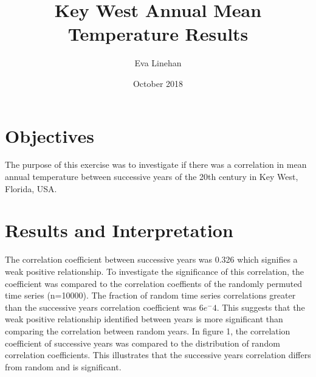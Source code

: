 \documentclass[12pt]{article}
\title{Key West Annual Mean Temperature Results}
\author{Eva Linehan}
\date{October 2018}
\begin{document}
  \maketitle
  
  \section{Objectives}
  The purpose of this exercise was to investigate if there was a correlation in mean annual temperature between successive years of the 20th century in Key West, Florida, USA.  
  
  \section{Results and Interpretation}
  The correlation coefficient between successive years was 0.326 which signifies a weak positive relationship. To investigate the significance of this correlation, the coefficient was compared to the correlation coeffients of the randomly permuted time series (n=10000). The fraction of random time series correlations greater than the successive years correlation coefficient was $6e^-4$. This suggests that the weak positive relationship identified between years is more significant than comparing the correlation between random years.
  In figure 1, the correlation coefficient of successive years was compared to the distribution of random correlation coefficients. This illustrates that the successive years correlation differs from random and is significant.
  
\end{document}

